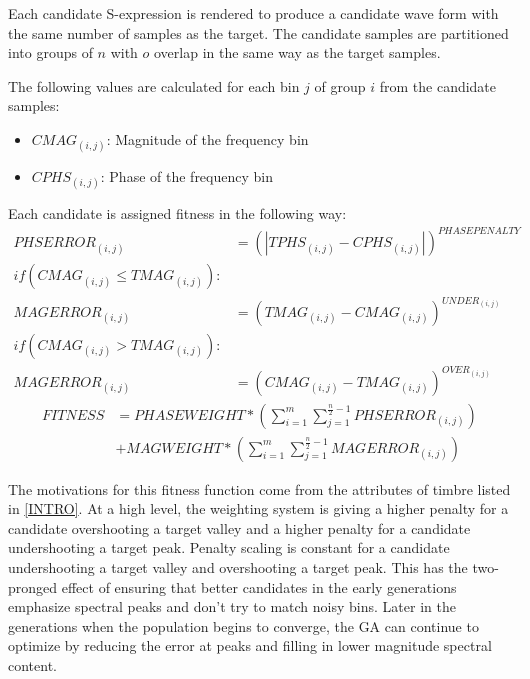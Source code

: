 \documentclass[12pt]{article}
\begin{document}
Each candidate S-expression is rendered to produce a candidate wave form with the same number of samples as the target. The candidate samples are partitioned into groups of $n$ with $o$ overlap in the same way as the target samples.

The following values are calculated for each bin $j$ of group $i$ from the candidate samples:
\begin{itemize}
\addtolength{\itemindent}{1cm}
\vspace{-3mm} 
\item $CMAG_{(i, j)}$: Magnitude of the frequency bin
\vspace{-3mm} 
\item $CPHS_{(i, j)}$: Phase of the frequency bin
\vspace{-2mm}
\end{itemize}

Each candidate is assigned fitness in the following way:
\vspace{-2mm} 
\begin{align*}
PHSERROR_{(i, j)} &= (|TPHS_{(i, j)} - CPHS_{(i, j)}|)^{PHASEPENALTY} \\
if (CMAG_{(i, j)} \le TMAG_{(i, j)}): \\
MAGERROR_{(i, j)} &= (TMAG_{(i, j)} - CMAG_{(i, j)})^{UNDER_{(i, j)}} \\
if (CMAG_{(i, j)} > TMAG_{(i, j)}): \\
MAGERROR_{(i, j)} &= (CMAG_{(i, j)} - TMAG_{(i, j)})^{OVER_{(i, j)}}
\end{align*}
\vspace{-8mm}
\begin{align*}
FITNESS &= PHASEWEIGHT * (\sum_{i=1}^{m} \sum_{j=1}^{\frac{n}{2} - 1} PHSERROR_{(i, j)}) \\
        &+ MAGWEIGHT * (\sum_{i=1}^{m} \sum_{j=1}^{\frac{n}{2} - 1} MAGERROR_{(i, j)})
\end{align*}
\vspace{-4mm}

The motivations for this fitness function come from the attributes of timbre listed in \ref{INTRO}. At a high level, the weighting system is giving a higher penalty for a candidate overshooting a target valley and a higher penalty for a candidate undershooting a target peak. Penalty scaling is constant for a candidate undershooting a target valley and overshooting a target peak. This has the two-pronged effect of ensuring that better candidates in the early generations emphasize spectral peaks and don't try to match noisy bins. Later in the generations when the population begins to converge, the GA can continue to optimize by reducing the error at peaks and filling in lower magnitude spectral content.
\end{document}
